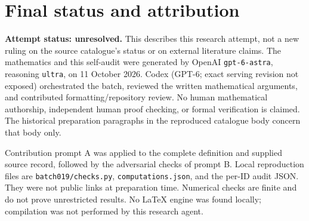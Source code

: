 \documentclass[11pt]{article}
\begin{document}
\section{Final status and attribution}
\textbf{Attempt status: unresolved.} This describes this research attempt, not a new ruling on the source catalogue's status or on external literature claims.
The mathematics and this self-audit were generated by OpenAI \texttt{gpt-6-astra}, reasoning \texttt{ultra}, on 11 October 2026. Codex (GPT-6; exact serving revision not exposed) orchestrated the batch, reviewed the written mathematical arguments, and contributed formatting/repository review. No human mathematical authorship, independent human proof checking, or formal verification is claimed. The historical preparation paragraphs in the reproduced catalogue body concern that body only.

Contribution prompt A was applied to the complete definition and supplied source record, followed by the adversarial checks of prompt B. Local reproduction files are \texttt{batch019/checks.py}, \texttt{computations.json}, and the per-ID audit JSON. They were not public links at preparation time. Numerical checks are finite and do not prove unrestricted results. No LaTeX engine was found locally; compilation was not performed by this research agent.
\end{document}
